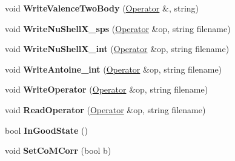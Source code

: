 \begin{DoxyCompactItemize}
\item 
\hypertarget{classReadWrite_aeb9256b7a68dcb45fac250b45af07548}{void {\bfseries Write\-Valence\-Two\-Body} (\hyperlink{classOperator}{Operator} \&, string)}\label{classReadWrite_aeb9256b7a68dcb45fac250b45af07548}

\item 
\hypertarget{classReadWrite_a8a7dc85b22c8f468d153d3fde9f39394}{void {\bfseries Write\-Nu\-Shell\-X\-\_\-sps} (\hyperlink{classOperator}{Operator} \&op, string filename)}\label{classReadWrite_a8a7dc85b22c8f468d153d3fde9f39394}

\item 
\hypertarget{classReadWrite_a2028159ab7f8c227613834b39794e157}{void {\bfseries Write\-Nu\-Shell\-X\-\_\-int} (\hyperlink{classOperator}{Operator} \&op, string filename)}\label{classReadWrite_a2028159ab7f8c227613834b39794e157}

\item 
\hypertarget{classReadWrite_a371194595d9412cbb8f1b432a6526f5a}{void {\bfseries Write\-Antoine\-\_\-int} (\hyperlink{classOperator}{Operator} \&op, string filename)}\label{classReadWrite_a371194595d9412cbb8f1b432a6526f5a}

\item 
\hypertarget{classReadWrite_a771ed1ac7ca0cc9cb6a209da170dd351}{void {\bfseries Write\-Operator} (\hyperlink{classOperator}{Operator} \&op, string filename)}\label{classReadWrite_a771ed1ac7ca0cc9cb6a209da170dd351}

\item 
\hypertarget{classReadWrite_ab924c67864c7af28bcc22a9b87abafb3}{void {\bfseries Read\-Operator} (\hyperlink{classOperator}{Operator} \&op, string filename)}\label{classReadWrite_ab924c67864c7af28bcc22a9b87abafb3}

\item 
\hypertarget{classReadWrite_a05ec8e21842e94d788bb36c7d11f46b9}{bool {\bfseries In\-Good\-State} ()}\label{classReadWrite_a05ec8e21842e94d788bb36c7d11f46b9}

\item 
\hypertarget{classReadWrite_a5e81dd4ce4adfe6fc08af81440003bb9}{void {\bfseries Set\-Co\-M\-Corr} (bool b)}\label{classReadWrite_a5e81dd4ce4adfe6fc08af81440003bb9}

\end{DoxyCompactItemize}
